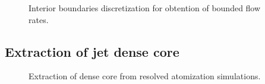 \begin{figure}[ht]
     \centering
     \caption{Interior boundaries discretization for obtention of bounded flow rates.}
      \label{fig:jicf_IBs_sketch_discretization}
\end{figure}



%

\subsection{Extraction of jet dense core}

\begin{figure}[ht]
     \centering
     \caption{Extraction of dense core from resolved atomization simulations.}
      \label{fig:dense_core_extraction}
\end{figure}




